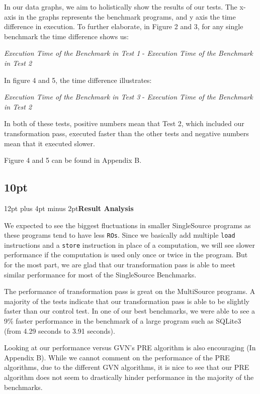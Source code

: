 \documentclass[onecolumn,10pt]{journal}
\begin{document}
In our data graphs, we aim to holistically show the results of our tests. The x-axis in the graphs represents the benchmark programs, and y axis the time difference in execution. To further elaborate, in Figure 2 and 3, for any single benchmark the time difference shows us:
\begin{center}
\textit{Execution Time of the Benchmark in Test 1} - \textit{Execution Time of the Benchmark in Test 2}
\end{center}
In figure 4 and 5, the time difference illustrates:
\begin{center}
\textit{Execution Time of the Benchmark in Test 3} - \textit{Execution Time of the Benchmark in Test 2}
\end{center}
In both of these tests, positive numbers mean that Test 2, which included our transformation pass, executed faster than the other tests and negative numbers mean that it executed slower.

Figure 4 and 5 can be found in Appendix B.

\noindent\titlespacing\subsection*{10pt}{12pt plus 4pt minus 2pt}\textbf{Result Analysis}

We expected to see the biggest fluctuations in smaller SingleSource programs as these programs tend to have less \texttt{ROs}. Since we basically add multiple \texttt{load} instructions and a \texttt{store} instruction in place of a computation, we will see slower performance if the computation is used only once or twice in the program. But for the most part, we are glad that our transformation pass is able to meet similar performance for most of the SingleSource Benchmarks. 

The performance of transformation pass is great on the MultiSource programs. A majority of the tests indicate that our transformation pass is able to be slightly faster than our control test. In one of our best benchmarks, we were able to see a 9\% faster performance in the benchmark of a large program such as SQLite3 (from 4.29 seconds to 3.91 seconds).

Looking at our performance versus GVN's PRE algorithm is also encouraging (In Appendix B). While we cannot comment on the performance of the PRE algorithms, due to the different GVN algorithms, it is nice to see that our PRE algorithm does not seem to drastically hinder performance in the majority of the benchmarks.
\end{document}
